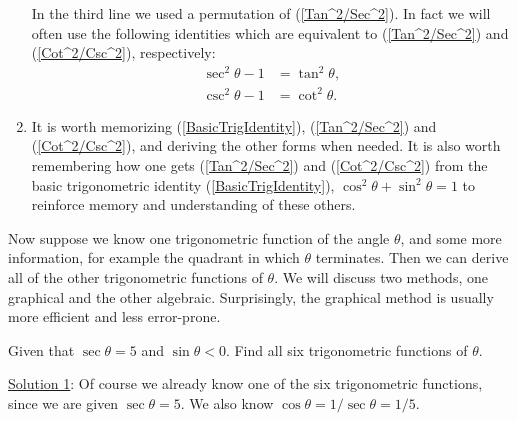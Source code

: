 \begin{enumerate}
In the third line we used a permutation of (\ref{Tan^2/Sec^2}).
In fact we will often use the following identities
which are equivalent to (\ref{Tan^2/Sec^2}) and
(\ref{Cot^2/Csc^2}), respectively:
\begin{align}
\sec^2\theta-1&=\tan^2\theta,\\
\csc^2\theta-1&=\cot^2\theta.\end{align}
\item It is worth memorizing (\ref{BasicTrigIdentity}),
(\ref{Tan^2/Sec^2}) and (\ref{Cot^2/Csc^2}), and 
deriving the other forms when needed.  It is also
worth remembering how one gets (\ref{Tan^2/Sec^2}) and (\ref{Cot^2/Csc^2})
from the basic trigonometric identity (\ref{BasicTrigIdentity}),
$\cos^2\theta+\sin^2\theta=1$ to reinforce memory
and understanding of these others.
\end{enumerate}

Now suppose we know one trigonometric function of the
angle $\theta$,  and some more information, for example
the quadrant in which $\theta$ terminates.
Then we can derive all of the other trigonometric
functions of $\theta$.  We will discuss two methods,
one graphical and the other algebraic.  Surprisingly,
the graphical method is usually more efficient and
less error-prone.

\bex Given that $\sec\theta=5$ and $\sin\theta<0$.  Find
all six trigonometric functions of $\theta$.

  \underline{Solution 1}: 
Of course we already know one of the six trigonometric functions,
since we are given $\sec\theta=5$.  We also know
$\cos\theta=1/\sec\theta=1/5$.  

